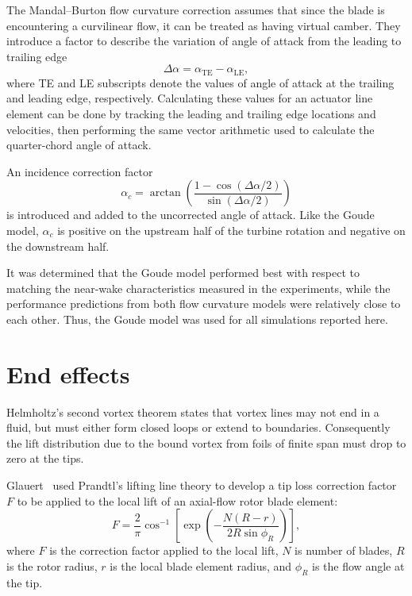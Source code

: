 \documentclass[times]{weauth}
\begin{document}
The Mandal--Burton flow curvature correction assumes that since the blade is
encountering a curvilinear flow, it can be treated as having virtual camber.
They introduce a factor to describe the variation of angle of attack from the
leading to trailing edge
\begin{equation}
    \Delta \alpha = \alpha_\mathrm{TE} - \alpha_\mathrm{LE},
    \label{eq:Mandal-Burton-alpha-diff}
\end{equation}
where TE and LE subscripts denote the values of angle of attack at the trailing
and leading edge, respectively. Calculating these values for an actuator line
element can be done by tracking the leading and trailing edge locations and
velocities, then performing the same vector arithmetic used to calculate the
quarter-chord angle of attack.

An incidence correction factor
\begin{equation}
    \alpha_c = \arctan \left( \frac{1 - \cos (\Delta \alpha / 2)}{\sin (\Delta
        \alpha / 2)} \right)
    \label{eq:Mandal-Burton-alpha-corr}
\end{equation}
is introduced and added to the uncorrected angle of attack. Like the Goude
model, $\alpha_c$ is positive on the upstream half of the turbine rotation and
negative on the downstream half.

It was determined that the Goude model performed best with respect to matching
the near-wake characteristics measured in the experiments, while the performance
predictions from both flow curvature models were relatively close to each other.
Thus, the Goude model was used for all simulations reported here.


\section{End effects}

Helmholtz's second vortex theorem states that vortex lines may not end in a
fluid, but must either form closed loops or extend to boundaries. Consequently
the lift distribution due to the bound vortex from foils of finite span must
drop to zero at the tips.

Glauert~\cite{Glauert1935} used Prandtl's lifting line theory \cite{Prandtl1927}
to develop a tip loss correction factor $F$ to be applied to the local lift of
an axial-flow rotor blade element:
\begin{equation}
    F = \frac{2}{\pi} \cos^{-1} \left[ \exp \left( - \frac{N (R-r)}{2R \sin
        \phi_R} \right) \right],
\end{equation}
where $F$ is the correction factor applied to the local lift, $N$ is number of
blades, $R$ is the rotor radius, $r$ is the local blade element radius, and
$\phi_R$ is the flow angle at the tip.
\end{document}
